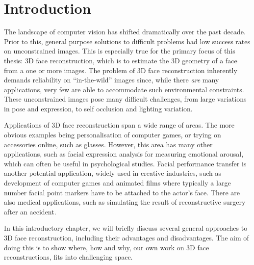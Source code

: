 \chapter{Introduction}

The landscape of computer vision has shifted dramatically over the
past decade. Prior to this, general purpose solutions to difficult
problems had low success rates on unconstrained images. This is
especially true for the primary focus of this thesis: 3D face
reconstruction, which is to estimate the 3D geometry of a face from a
one or more images. The problem of 3D face reconstruction inherently
demands reliability on ``in-the-wild'' images since, while there
\textit{are} many applications, very few are able to accommodate such
environmental constraints. These unconstrained images pose many
difficult challenges, from large variations in pose and expression, to
self occlusion and lighting variation.

Applications of 3D face reconstruction span a wide range of areas. The
more obvious examples being personalisation of computer games, or
trying on accessories online, such as glasses. However, this area has
many other applications, such as facial expression analysis for
measuring emotional arousal, which can often be useful in
psychological studies. Facial performance transfer is another
potential application, widely used in creative industries, such as
development of computer games and animated films where typically a
large number facial point markers have to be attached to the actor's
face. There are also medical applications, such as simulating the
result of reconstructive surgery after an accident.

In this introductory chapter, we will briefly discuss several general
approaches to 3D face reconstruction, including their advantages and
disadvantages. The aim of doing this is to show where, how and why,
our own work on 3D face reconstructions, fits into challenging space.


